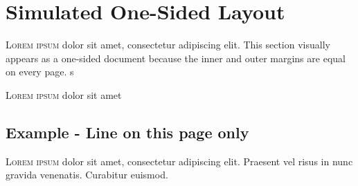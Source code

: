 \documentclass[12pt]{book}
\begin{document}
  \frontmatter
  \let\oldcleardoublepage\cleardoublepage
  \let\cleardoublepage\clearpage %
  
  
  \onesidedpaper
  
  
  
  
  \tableofcontents%
  
  
  
  









  
  \mainmatter
  \let\cleardoublepage\oldcleardoublepage %









  \twosidedpaper %


  
  \chapter{Simulated One-Sided Layout}
  \lettrine{L}{orem ipsum} dolor sit amet, consectetur adipiscing elit. 
  This section visually appears as a one-sided document because the inner and 
  outer margins are equal on every page. s
  \lipsum[1-2]

  \lettrine{L}{orem ipsum} dolor sit amet \lipsum[1-2]



  \section*{Example - Line on this page only}

  \lettrine[lines=3]{L}{orem ipsum} dolor sit amet, consectetur adipiscing elit. 
  Praesent vel risus in nunc gravida venenatis. Curabitur euismod.
  \lipsum[1-2]
\end{document}
